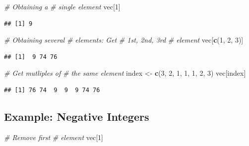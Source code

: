 \documentclass[
]{book}
\newenvironment{Shaded}{\begin{snugshade}}{\end{snugshade}}
\newcommand{\CommentTok}[1]{\textcolor[rgb]{0.56,0.35,0.01}{\textit{#1}}}
\newcommand{\DecValTok}[1]{\textcolor[rgb]{0.00,0.00,0.81}{#1}}
\newcommand{\KeywordTok}[1]{\textcolor[rgb]{0.13,0.29,0.53}{\textbf{#1}}}
\newcommand{\NormalTok}[1]{#1}
\newcommand{\StringTok}[1]{\textcolor[rgb]{0.31,0.60,0.02}{#1}}
\begin{document}
\begin{Shaded}
\begin{Highlighting}[]
\CommentTok{# Obtaining a}
\CommentTok{# single element}
\NormalTok{vec[}\DecValTok{1}\NormalTok{]}
\end{Highlighting}
\end{Shaded}

\begin{verbatim}
## [1] 9
\end{verbatim}

\begin{Shaded}
\begin{Highlighting}[]
\CommentTok{# Obtaining several}
\CommentTok{# elements: Get}
\CommentTok{# 1st, 2nd, 3rd}
\CommentTok{# element}
\NormalTok{vec[}\KeywordTok{c}\NormalTok{(}\DecValTok{1}\NormalTok{, }\DecValTok{2}\NormalTok{, }\DecValTok{3}\NormalTok{)]}
\end{Highlighting}
\end{Shaded}

\begin{verbatim}
## [1]  9 74 76
\end{verbatim}

\begin{Shaded}
\begin{Highlighting}[]
\CommentTok{# Get mutliples of}
\CommentTok{# the same element}
\NormalTok{index <-}\StringTok{ }\KeywordTok{c}\NormalTok{(}\DecValTok{3}\NormalTok{, }\DecValTok{2}\NormalTok{, }\DecValTok{1}\NormalTok{, }\DecValTok{1}\NormalTok{,}
    \DecValTok{1}\NormalTok{, }\DecValTok{2}\NormalTok{, }\DecValTok{3}\NormalTok{)}
\NormalTok{vec[index]}
\end{Highlighting}
\end{Shaded}

\begin{verbatim}
## [1] 76 74  9  9  9 74 76
\end{verbatim}

\hypertarget{example-negative-integers}{%
\subsection*{Example: Negative Integers}\label{example-negative-integers}}

\begin{Shaded}
\begin{Highlighting}[]
\CommentTok{# Remove first}
\CommentTok{# element}
\NormalTok{vec[}\DecValTok{1}\NormalTok{]}
\end{Highlighting}
\end{Shaded}
\end{document}
